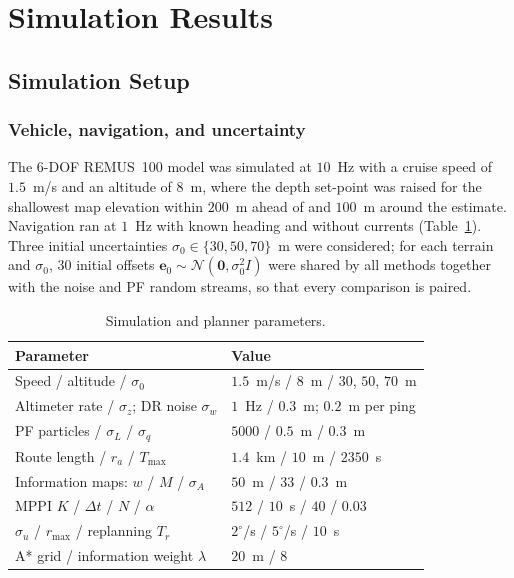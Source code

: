\documentclass[letterpaper, 10 pt, journal, twoside]{IEEEtran}
\begin{document}
\section{Simulation Results}
\label{sec:results}

\subsection{Simulation Setup}
\label{sec:setup}
\subsubsection{Vehicle, navigation, and uncertainty}
The 6-DOF REMUS~100 model was simulated at $10$~Hz with a cruise speed of $1.5$~m/s and an altitude of $8$~m, where the depth set-point was raised for the shallowest map elevation within $200$~m ahead of and $100$~m around the estimate. Navigation ran at $1$~Hz with known heading and without currents (Table~\ref{tab:params}). Three initial uncertainties $\sigma_0 \in \{30, 50, 70\}$~m were considered; for each terrain and $\sigma_0$, $30$ initial offsets $\mathbf{e}_0 \sim \mathcal{N}(\mathbf{0}, \sigma_0^2 I)$ were shared by all methods together with the noise and PF random streams, so that every comparison is paired.

\begin{table}
\caption{Simulation and planner parameters.}
\centering
\footnotesize
\setlength{\tabcolsep}{4pt}
\begin{tabular}{l l}
\hline
\textbf{Parameter} & \textbf{Value} \\ \hline
Speed / altitude / $\sigma_0$ & $1.5$~m/s / $8$~m / $30$, $50$, $70$~m \\
Altimeter rate / $\sigma_z$; DR noise $\sigma_w$ & $1$~Hz / $0.3$~m; $0.2$~m per ping \\
PF particles / $\sigma_L$ / $\sigma_q$ & $5000$ / $0.5$~m / $0.3$~m \\
Route length / $r_a$ / $T_{\max}$ & $1.4$~km / $10$~m / $2350$~s \\
Information maps: $w$ / $M$ / $\sigma_A$ & $50$~m / $33$ / $0.3$~m \\
MPPI $K$ / $\Delta t$ / $N$ / $\alpha$ & $512$ / $10$~s / $40$ / $0.03$ \\
$\sigma_u$ / $r_{\max}$ / replanning $T_r$ & $2^\circ$/s / $5^\circ$/s / $10$~s \\
A* grid / information weight $\lambda$ & $20$~m / $8$ \\
\hline
\end{tabular}
\label{tab:params}
\vspace{-12pt}
\end{table}
\end{document}
